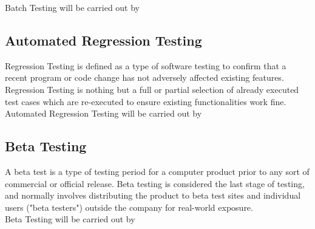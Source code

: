 Batch Testing will be carried out by 



\subsection{Automated Regression Testing}
Regression Testing is defined as a type of software testing to confirm that a recent program or code change has not adversely affected existing features. Regression Testing is nothing but a full or partial selection of already executed test cases which are re-executed to ensure existing functionalities work fine.\\


Automated Regression Testing will be carried out by 



\subsection{Beta Testing}
A beta test is a type of testing period for a computer product prior to any sort of commercial or official release. Beta testing is considered the last stage of testing, and normally involves distributing the product to beta test sites and individual users ("beta testers") outside the company for real-world exposure.\\

Beta Testing will be carried out by 
